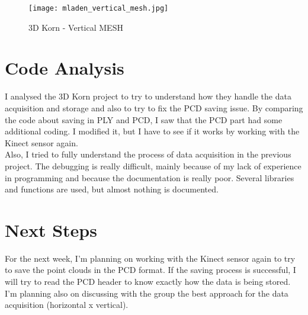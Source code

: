 \documentclass[aps,letterpaper,11pt]{revtex4}
\begin{document}
\begin{figure}[!htb]
\centering
\texttt{[image: mladen\_vertical\_mesh.jpg]}
\caption{3D Korn - Vertical MESH}
\end{figure}


\section{Code Analysis}
I analysed the 3D Korn project to try to understand how they handle the data acquisition and storage and also to try to fix the PCD saving issue. By comparing the code about saving in PLY and PCD, I saw that the PCD part had some additional coding. I modified it, but I have to see if it works by working with the Kinect sensor again.\\
Also, I tried to fully understand the process of data acquisition in the previous project. The debugging is really difficult, mainly because of my lack of experience in programming and because the documentation is really poor. Several libraries and functions are used, but almost nothing is documented.\\
\section{Next Steps}
For the next week, I'm planning on working with the Kinect sensor again to try to save the point clouds in the PCD format. If the saving process is successful, I will try to read the PCD header to know exactly how the data is being stored.\\
I'm planning also on discussing with the group the best approach for the data acquisition  (horizontal x vertical).
\\
\end{document}

